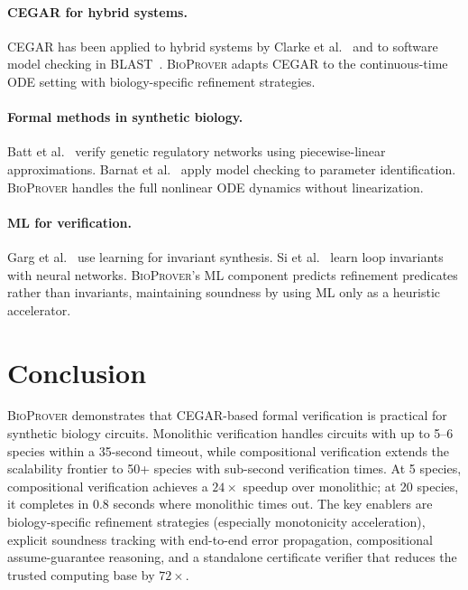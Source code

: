 \documentclass[11pt]{article}
\newcommand{\bioprover}{\textsc{BioProver}}
\newcommand{\cegar}{\textsc{CEGAR}}
\begin{document}
\paragraph{CEGAR for hybrid systems.}
\cegar{} has been applied to hybrid systems by Clarke et
al.~\cite{clarke2003verification} and to software model checking in
BLAST~\cite{beyer2007configurable}. \bioprover{} adapts \cegar{} to
the continuous-time ODE setting with biology-specific refinement
strategies.

\paragraph{Formal methods in synthetic biology.}
Batt et al.~\cite{batt2007genetic} verify genetic regulatory networks
using piecewise-linear approximations. Barnat et
al.~\cite{barnat2009parameter} apply model checking to parameter
identification. \bioprover{} handles the full nonlinear ODE dynamics
without linearization.

\paragraph{ML for verification.}
Garg et al.~\cite{garg2014ice} use learning for invariant synthesis.
Si et al.~\cite{si2018learning} learn loop invariants with neural
networks. \bioprover{}'s ML component predicts refinement predicates
rather than invariants, maintaining soundness by using ML only as a
heuristic accelerator.

\section{Conclusion}
\label{sec:conclusion}

\bioprover{} demonstrates that \cegar{}-based formal verification is
practical for synthetic biology circuits. Monolithic verification
handles circuits with up to 5--6 species within a 35-second timeout,
while compositional verification extends the scalability frontier to
50+ species with sub-second verification times. At 5 species,
compositional verification achieves a $24\times$ speedup over
monolithic; at 20 species, it completes in 0.8 seconds where
monolithic times out. The key enablers are biology-specific
refinement strategies (especially monotonicity acceleration),
explicit soundness tracking with end-to-end error propagation,
compositional assume-guarantee reasoning, and a standalone
certificate verifier that reduces the trusted computing base by
$72\times$.
\end{document}
